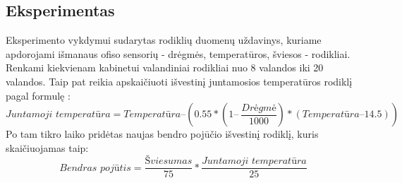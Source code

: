 \documentclass{VUMIFPSbakalaurinis}
\begin{document}
\subsection{Eksperimentas}

Eksperimento vykdymui sudarytas rodiklių duomenų uždavinys, kuriame apdorojami išmanaus ofiso sensorių - drėgmės, temperatūros, šviesos - rodikliai. Renkami kiekvienam kabinetui valandiniai rodikliai nuo 8 valandos iki 20 valandos. Taip pat reikia apskaičiuoti išvestinį juntamosios temperatūros rodiklį pagal formulę \cite{anderson2013methods}: 
\[\textit{Juntamoji temperatūra} = \textit{Temperatūra} – (0.55 * (1 –\>\frac{\textit{Drėgmė}}{1000}) * (\textit{Temperatūra} – 14.5))\]
Po tam tikro laiko pridėtas naujas bendro pojūčio išvestinį rodiklį, kuris skaičiuojamas taip: 
\[\textit{Bendras pojūtis} = \frac{\textit{Šviesumas}}{75} * \frac{\textit{Juntamoji temperatūra}}{25} \]
\end{document}
